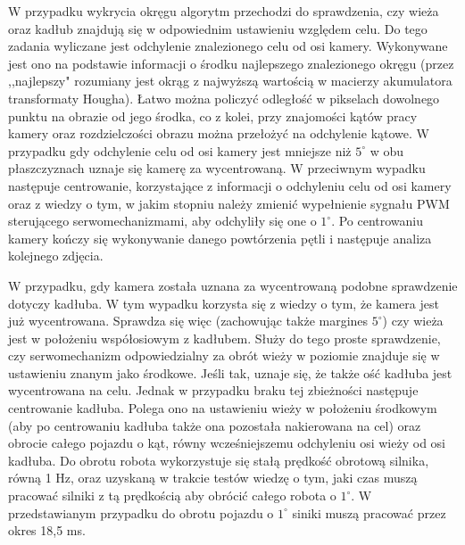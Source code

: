 W przypadku wykrycia okręgu algorytm przechodzi do sprawdzenia, czy wieża oraz kadłub znajdują się w odpowiednim ustawieniu względem celu. Do tego zadania wyliczane jest odchylenie znalezionego celu od osi kamery. Wykonywane jest ono na podstawie informacji o środku najlepszego znalezionego okręgu (przez ,,najlepszy" rozumiany jest okrąg z najwyższą wartością w macierzy akumulatora transformaty Hougha). Łatwo można policzyć odległość w pikselach dowolnego punktu na obrazie od jego środka, co z kolei, przy znajomości kątów pracy kamery oraz rozdzielczości obrazu można przełożyć na odchylenie kątowe. W przypadku gdy odchylenie celu od osi kamery jest mniejsze niż $5^\circ$ w obu płaszczyznach uznaje się kamerę za wycentrowaną. W przeciwnym wypadku następuje centrowanie, korzystające z informacji o odchyleniu celu od osi kamery oraz z wiedzy o tym, w jakim stopniu należy zmienić wypełnienie sygnału PWM sterującego serwomechanizmami, aby odchyliły się one o $1^\circ$. Po centrowaniu kamery kończy się wykonywanie danego powtórzenia pętli i następuje analiza kolejnego zdjęcia.

W przypadku, gdy kamera została uznana za wycentrowaną podobne sprawdzenie dotyczy kadłuba. W tym wypadku korzysta się z wiedzy o tym, że kamera jest już wycentrowana. Sprawdza się więc (zachowując także margines $5^\circ$) czy wieża jest w położeniu współosiowym z kadłubem. Służy do tego proste sprawdzenie, czy serwomechanizm odpowiedzialny za obrót wieży w poziomie znajduje się w ustawieniu znanym jako środkowe. Jeśli tak, uznaje się, że także ość kadłuba jest wycentrowana na celu. Jednak w przypadku braku tej zbieżności następuje centrowanie kadłuba. Polega ono na ustawieniu wieży w położeniu środkowym (aby po centrowaniu kadłuba także ona pozostała nakierowana na cel) oraz obrocie całego pojazdu o kąt, równy wcześniejszemu odchyleniu osi wieży od osi kadłuba. Do obrotu robota wykorzystuje się stałą prędkość obrotową silnika, równą 1 Hz, oraz uzyskaną w trakcie testów wiedzę o tym, jaki czas muszą pracować silniki z tą prędkością aby obrócić całego robota o $1^\circ$. W przedstawianym przypadku do obrotu pojazdu o $1^\circ$ siniki muszą pracować przez okres 18,5 ms.

